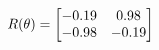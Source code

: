 \documentclass[preview]{standalone}
\begin{document}
\begin{align*}
\special{dvisvgm:raw <g id='unique000'>}R(\theta) = \begin{bmatrix}-0.19 & 0.98\\-0.98 & -0.19\end{bmatrix}\special{dvisvgm:raw </g>}
\end{align*}
\end{document}
